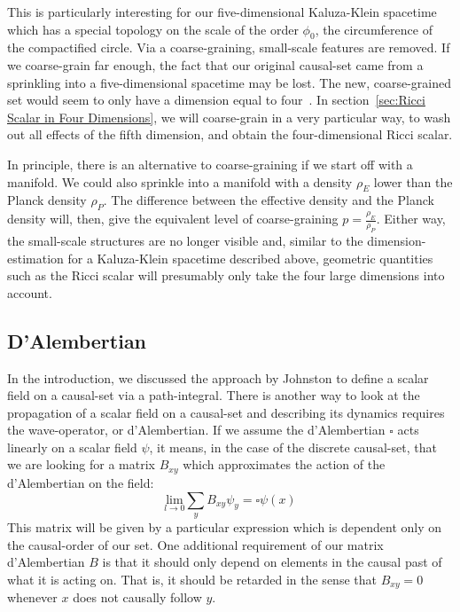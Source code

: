 \documentclass[a4paper,12pt]{article}
\numberwithin{equation}{section}
\begin{document}
This is particularly interesting for our five-dimensional Kaluza-Klein spacetime which has a special topology on the scale of the order $\phi_0$, the circumference of the compactified circle. Via a coarse-graining, small-scale features are removed. If we coarse-grain far enough, the fact that our original causal-set came from a sprinkling into a five-dimensional spacetime may be lost. The new, coarse-grained set would seem to only have a dimension equal to four~\cite{Meyer1988}. In section~\ref{sec:Ricci Scalar in Four Dimensions}, we will coarse-grain in a very particular way, to wash out all effects of the fifth dimension, and obtain the four-dimensional Ricci scalar.

In principle, there is an alternative to coarse-graining if we start off with a manifold. We could also sprinkle into a manifold with a density $\rho_E$ lower than the Planck density $\rho_P$. The difference between the effective density and the Planck density will, then, give the equivalent level of coarse-graining $p=\frac{\rho_E}{\rho_P}$. Either way, the small-scale structures are no longer visible and, similar to the dimension-estimation for a Kaluza-Klein spacetime described above, geometric quantities such as the Ricci scalar will presumably only take the four large dimensions into account.


\subsection{D'Alembertian}
\label{sec:D'Alembertian}

In the introduction, we discussed the approach by Johnston to define a scalar field on a causal-set via a path-integral. There is another way to look at the propagation of a scalar field on a causal-set and describing its dynamics requires the wave-operator, or d'Alembertian. If we assume the d'Alembertian $\square$ acts linearly on a scalar field $\psi$, it means, in the case of the discrete causal-set, that we are looking for a matrix $B_{xy}$ which approximates the action of the d'Alembertian on the field:
\begin{equation}
\label{eq:D'Alembertian}
\underset{l\rightarrow 0}{\text{lim}} \sum_y B_{xy} \psi_y=\square \psi(x)
\end{equation}
This matrix will be given by a particular expression which is dependent only on the causal-order of our set. One additional requirement of our matrix d'Alembertian $B$ is that it should only depend on elements in the causal past of what it is acting on. That is, it should be retarded in the sense that $B_{xy}=0$ whenever $x$ does not causally follow $y$.
\end{document}
